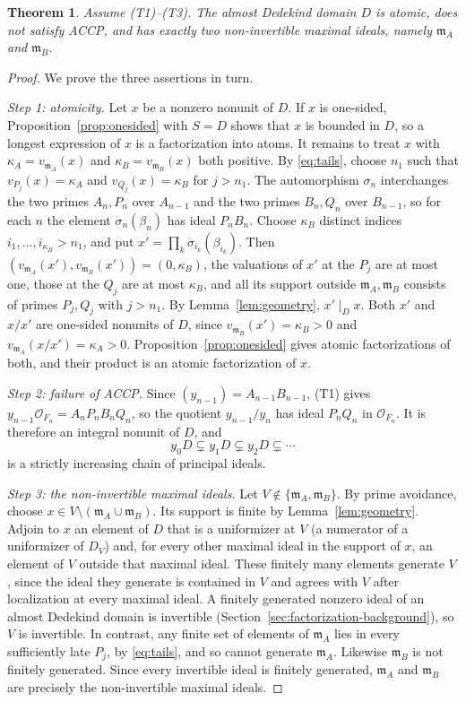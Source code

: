 \documentclass[11pt]{article}
\theoremstyle{plain}
\newtheorem{theorem}{Theorem}[section]
\theoremstyle{definition}
\theoremstyle{remark}
\newcommand{\OO}{\mathcal O}
\newcommand{\EA}{\mathfrak m_A}
\newcommand{\EB}{\mathfrak m_B}
\begin{document}
\begin{theorem}\label{thm:ambient}
Assume \textup{(T1)--(T3)}.  The almost Dedekind domain $D$ is atomic,
does not satisfy ACCP, and has exactly two non-invertible maximal ideals,
namely $\EA$ and $\EB$.
\end{theorem}

\begin{proof}
We prove the three assertions in turn.

\emph{Step 1: atomicity.}  Let $x$ be a nonzero nonunit of $D$.  If $x$ is
one-sided, Proposition~\ref{prop:onesided} with $S=D$ shows that $x$ is
bounded in $D$, so a longest expression of $x$ is a factorization into
atoms.  It remains to treat $x$ with $\kappa_A=v_{\EA}(x)$ and
$\kappa_B=v_{\EB}(x)$ both positive.  By \eqref{eq:tails}, choose $n_1$
such that $v_{P_j}(x)=\kappa_A$ and $v_{Q_j}(x)=\kappa_B$ for $j>n_1$.
The automorphism $\sigma_n$ interchanges the two primes $A_n,P_n$ over
$A_{n-1}$ and the two primes $B_n,Q_n$ over $B_{n-1}$, so for each $n$
the element $\sigma_n(\beta_n)$ has ideal $P_nB_n$.  Choose $\kappa_B$
distinct indices $i_1,\ldots,i_{\kappa_B}>n_1$, and put
$x'=\prod_k\sigma_{i_k}(\beta_{i_k})$.  Then
$(v_{\EA}(x'),v_{\EB}(x'))=(0,\kappa_B)$, the valuations of $x'$ at the
$P_j$ are at most one, those at the $Q_j$ are at most $\kappa_B$, and
all its support outside $\EA,\EB$ consists of primes $P_j,Q_j$ with
$j>n_1$.  By Lemma~\ref{lem:geometry}, $x'\mid_Dx$.  Both $x'$ and $x/x'$
are one-sided nonunits of $D$, since $v_{\EB}(x')=\kappa_B>0$ and
$v_{\EA}(x/x')=\kappa_A>0$.  Proposition~\ref{prop:onesided} gives atomic
factorizations of both, and their product is an atomic factorization of
$x$.

\emph{Step 2: failure of ACCP.}  Since $(y_{n-1})=A_{n-1}B_{n-1}$, (T1) gives
$y_{n-1}\OO_{F_n}=A_nP_nB_nQ_n$, so the quotient $y_{n-1}/y_n$ has ideal
$P_nQ_n$ in $\OO_{F_n}$.  It is therefore an integral nonunit of $D$, and
\[
 y_0D\subsetneq y_1D\subsetneq y_2D\subsetneq\cdots
\]
is a strictly increasing chain of principal ideals.

\emph{Step 3: the non-invertible maximal ideals.}  Let
$V\notin\{\EA,\EB\}$.  By prime avoidance, choose $x\in
V\setminus(\EA\cup\EB)$.  Its support is finite by
Lemma~\ref{lem:geometry}.  Adjoin to $x$ an element of $D$ that is a
uniformizer at $V$ (a numerator of a uniformizer of $D_V$) and, for every
other maximal ideal in the support of $x$, an element of $V$ outside that
maximal ideal.  These finitely many elements generate $V$, since the
ideal they generate is contained in $V$ and agrees with $V$ after
localization at every maximal ideal.  A finitely generated nonzero ideal
of an almost Dedekind domain is invertible
(Section~\ref{sec:factorization-background}), so $V$ is invertible.  In
contrast, any finite set of elements of $\EA$ lies in every sufficiently
late $P_j$, by \eqref{eq:tails}, and so cannot generate $\EA$.  Likewise
$\EB$ is not finitely generated.  Since every invertible ideal is finitely
generated, $\EA$ and $\EB$ are precisely the non-invertible maximal ideals.
\end{proof}
\end{document}
